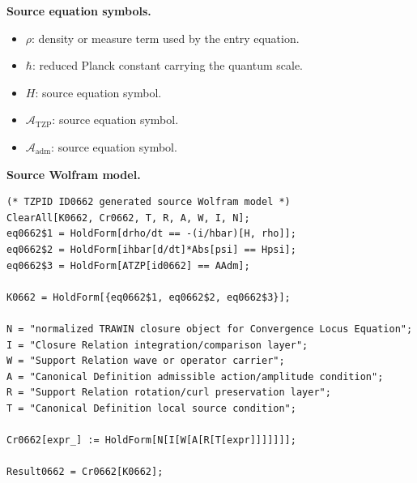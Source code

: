 \begin{minipage}[t]{0.49\linewidth}
\begingroup
\small
\raggedright
\textbf{Source equation symbols.}\par
\begin{itemize}[leftmargin=1.35em,itemsep=1pt,topsep=1pt,parsep=0pt]
    \item $\rho$: density or measure term used by the entry equation.
    \item $\hbar$: reduced Planck constant carrying the quantum scale.
    \item $H$: source equation symbol.
    \item $\mathcal{A}_{\mathrm{TZP}}$: source equation symbol.
    \item $\mathcal{A}_{\mathrm{adm}}$: source equation symbol.
\end{itemize}
\endgroup
\end{minipage}\hfill
\begin{minipage}[t]{0.47\linewidth}
\begingroup
\scriptsize
\raggedright
\textbf{Source Wolfram model.}\par
\begin{Verbatim}[fontsize=\tiny,breaklines=true,breakanywhere=true]
(* TZPID ID0662 generated source Wolfram model *)
ClearAll[K0662, Cr0662, T, R, A, W, I, N];
eq0662$1 = HoldForm[drho/dt == -(i/hbar)[H, rho]];
eq0662$2 = HoldForm[ihbar[d/dt]*Abs[psi] == Hpsi];
eq0662$3 = HoldForm[ATZP[id0662] == AAdm];

K0662 = HoldForm[{eq0662$1, eq0662$2, eq0662$3}];

N = "normalized TRAWIN closure object for Convergence Locus Equation";
I = "Closure Relation integration/comparison layer";
W = "Support Relation wave or operator carrier";
A = "Canonical Definition admissible action/amplitude condition";
R = "Support Relation rotation/curl preservation layer";
T = "Canonical Definition local source condition";

Cr0662[expr_] := HoldForm[N[I[W[A[R[T[expr]]]]]]];

Result0662 = Cr0662[K0662];
\end{Verbatim}
\endgroup
\end{minipage}

